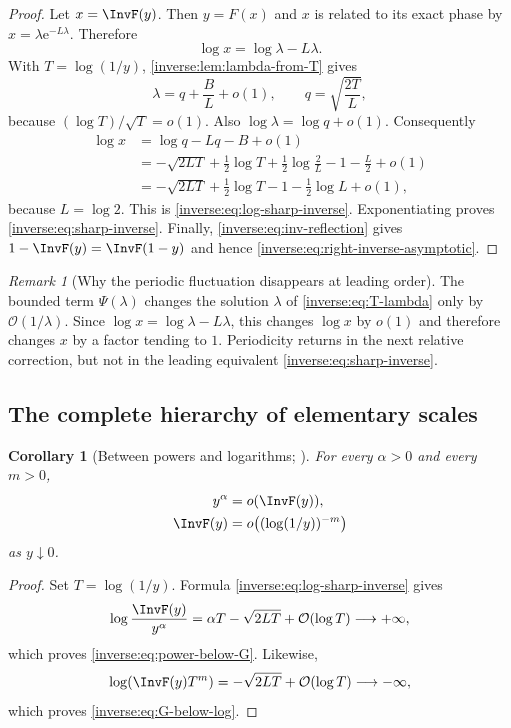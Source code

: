 \documentclass[11pt,oneside]{article}
\newtheorem{corollary}[theorem]{Corollary}
\theoremstyle{definition}
\theoremstyle{remark}
\newtheorem{remark}[theorem]{Remark}
\newcommand{\e}{\mathrm e}
\newcommand{\bigO}{\mathcal O}
\begin{document}
\begin{proof}
Let $x=\InvF(y)$.  Then $y=F(x)$ and $x$ is related to its exact phase by
$x=\lambda\e^{-L\lambda}$.  Therefore
\[
 \log x=\log\lambda-L\lambda.
\]
With $T=\log(1/y)$, \cref{inverse:lem:lambda-from-T} gives
\[
 \lambda=q+\frac BL+o(1),\qquad
 q=\sqrt{\frac{2T}{L}},
\]
because $(\log T)/\sqrt T=o(1)$.  Also $\log\lambda=\log q+o(1)$.
Consequently
\begin{align*}
 \log x
 &=\log q-Lq-B+o(1)\\
 &=-\sqrt{2LT}
   +\frac12\log T+\frac12\log\frac2L
   -1-\frac L2+o(1)\\
 &=-\sqrt{2LT}
   +\frac12\log T-1-\frac12\log L+o(1),
\end{align*}
because $L=\log2$.  This is \eqref{inverse:eq:log-sharp-inverse}.
Exponentiating proves \eqref{inverse:eq:sharp-inverse}.  Finally,
\eqref{inverse:eq:inv-reflection} gives
$1-\InvF(y)=\InvF(1-y)$ and hence
\eqref{inverse:eq:right-inverse-asymptotic}.
\end{proof}

\begin{remark}[Why the periodic fluctuation disappears at leading order]
The bounded term $\Psi(\lambda)$ changes the solution $\lambda$ of
\eqref{inverse:eq:T-lambda} only by $\bigO(1/\lambda)$.  Since
$\log x=\log\lambda-L\lambda$, this changes $\log x$ by $o(1)$ and
therefore changes $x$ by a factor tending to $1$.  Periodicity returns in
the next relative correction, but not in the leading equivalent
\eqref{inverse:eq:sharp-inverse}.
\end{remark}

\subsection{The complete hierarchy of elementary scales}

\begin{corollary}[Between powers and logarithms; \Derived]
\label{inverse:cor:inverse-scale-hierarchy}
For every $\alpha>0$ and every $m>0$,
\begin{align}
 y^\alpha&=o(\InvF(y)), \label{inverse:eq:power-below-G}\\
 \InvF(y)&=o\!\left((\log(1/y))^{-m}\right)
 \label{inverse:eq:G-below-log}
\end{align}
as $y\downarrow0$.
\end{corollary}

\begin{proof}
Set $T=\log(1/y)$.  Formula \eqref{inverse:eq:log-sharp-inverse} gives
\[
 \log\frac{\InvF(y)}{y^\alpha}
 =\alpha T-\sqrt{2LT}+\bigO(\log T)\longrightarrow+\infty,
\]
which proves \eqref{inverse:eq:power-below-G}.  Likewise,
\[
 \log\!\left(\InvF(y)T^m\right)
 =-\sqrt{2LT}+\bigO(\log T)\longrightarrow-\infty,
\]
which proves \eqref{inverse:eq:G-below-log}.
\end{proof}
\end{document}
